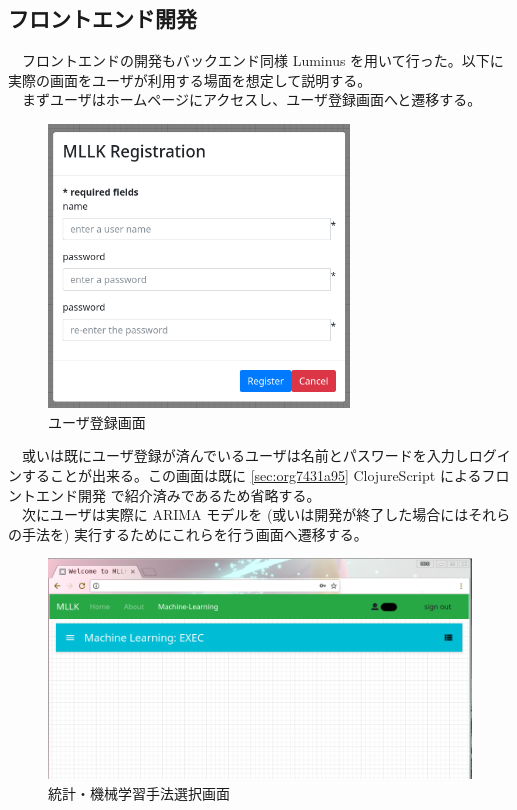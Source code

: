 \documentclass{scrartcl}
\begin{document}
\subsection{フロントエンド開発}
\label{sec:orgcc0a17e}
　フロントエンドの開発もバックエンド同様 Luminus を用いて行った。以下に実際の画面をユーザが利用する場面を想定して説明する。\\
　まずユーザはホームページにアクセスし、ユーザ登録画面へと遷移する。\\
\begin{figure}[htbp]
\centering
\includegraphics[width=8cm]{./register.PNG}
\caption{ユーザ登録画面}
\end{figure}

　或いは既にユーザ登録が済んでいるユーザは名前とパスワードを入力しログインすることが出来る。この画面は既に \ref{sec:org7431a95} ClojureScript によるフロントエンド開発 で紹介済みであるため省略する。\\
　次にユーザは実際に ARIMA モデルを (或いは開発が終了した場合にはそれらの手法を) 実行するためにこれらを行う画面へ遷移する。\\
\begin{figure}[htbp]
\centering
\includegraphics[width=12cm]{./ml-view.PNG}
\caption{統計・機械学習手法選択画面}
\end{figure}
\end{document}
